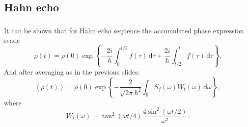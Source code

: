 \documentclass[aspectratio=169, 13pt]{beamer}
\newcommand{\diff}{\,\mathrm{d}}
\begin{document}
\subsection{Hahn echo}
\begin{frame}[c]\frametitle{\secname}\framesubtitle{\subsecname}
It can be shown that for Hahn echo sequence the accumulated phase expression reads
\begin{equation*}
\rho(t) = \rho(0)\exp \left\{ - \frac{2i}{\hbar}\int_0^{t/2} f(\tau)  \diff \tau + \frac{2i}{\hbar}\int_{t/2}^{t} f(\tau)  \diff \tau \right\}.
\end{equation*}
And after averaging as in the previous slides:
\[
\left<\rho(t)\right> = \rho(0)\exp \left\{ - \frac{2}{\sqrt{2\pi} \hbar^2} \int_\mathbb{R} S_f(\omega) W_t (\omega)\diff \omega \right\},
\label{eq:cdeph_se}
\]
where
\[
W_t (\omega) = \tan^2(\omega t/4)\frac{4 \sin^2(\omega t/2)}{\omega^2}.
\]
\end{frame}
\end{document}
